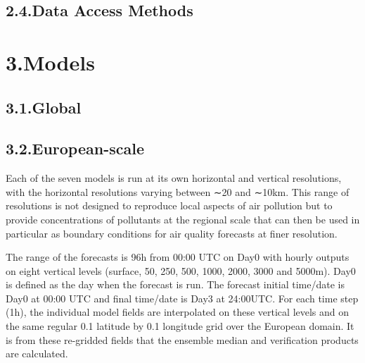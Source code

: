 \documentclass[9pt]{article}
\begin{document}
\subsection{2.4.\hspace*{0.5em}Data Access Methods}\label{sec-data-access-methods}%

\section{3.\hspace*{0.5em}Models}\label{sec-models}%

\subsection{3.1.\hspace*{0.5em}Global}\label{sec-global}%

\subsection{3.2.\hspace*{0.5em}European-scale}\label{sec-european-scale}%

\noindent{}Each of the seven models is run at its own horizontal and vertical resolutions, with the horizontal resolutions varying between ∼20 and ∼10km. 
This range of resolutions is not designed to reproduce local aspects of air pollution but to provide concentrations of pollutants at the regional scale that can then be used in particular as boundary conditions for air quality forecasts at finer resolution.%

The range of the forecasts is 96h from 00:00 UTC on Day0 with hourly outputs on eight vertical levels (surface, 50, 250, 500, 1000, 2000, 3000 and 5000m). 
Day0 is defined as the day when the forecast is run. 
The forecast initial time/date is Day0 at 00:00 UTC and final time/date is Day3 at 24:00UTC. 
For each time step (1h), the individual model fields are interpolated on these vertical levels and on the same regular 0.1\textdegree{} latitude by 0.1\textdegree{} longitude grid over the European domain. 
It is from these re-gridded fields that the ensemble median and verification products are calculated.%
\end{document}
